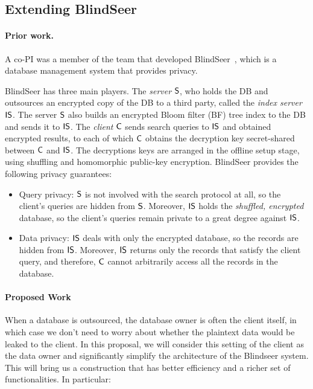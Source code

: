 
\subsection{Extending BlindSeer}
\label{sec:ext-blindseer}

\paragraph{Prior work.} A co-PI was a member of the team that developed
BlindSeer~\cite{SP:PKVKMC14,SP:FVKKKM15}, which is a database management system
that provides privacy.

BlindSeer has three main players. The {\em server} $\sf S$,
who holds the DB and outsources an encrypted copy of the DB to a third party,
called the {\em index server} $\sf IS$. The server $\sf S$  also builds an
encrypted Bloom filter (BF) tree index to the DB and sends it to $\sf IS$. The
{\em client} $\sf C$ sends search queries to $\sf IS$ and obtained encrypted
results, to each of which $\sf C$ obtains the decryption key secret-shared
between $\sf C$ and $\sf IS$. The decryptions keys are arranged in the offline
setup stage, using shuffling and homomorphic public-key
encryption.
%
BlindSeer provides the following privacy guarantees:
\begin{itemize}
\item Query privacy: $\sf S$ is not involved with the search protocol at
  all, so the client's queries are hidden from $\sf S$. Moreover, $\sf IS$ holds
    the {\em shuffled, encrypted} database, so the client's queries remain
    private to a great degree against $\sf IS$. 

\item Data privacy: $\sf IS$ deals with only the encrypted database, so the
records are hidden from $\sf IS$. Moreover, $\sf IS$ returns only the records
that satisfy the client query, and therefore, $\sf C$ cannot arbitrarily access
all the records in the database.  
\end{itemize}

\paragraph{Proposed Work}
When a database is outsourced, the database owner is often the client
itself, in which case we don't need to worry about whether the plaintext data
would be leaked to the client.  In this proposal, we will consider this setting
of the client as the data owner and significantly simplify the architecture of
the Blindseer system. This will bring us a construction that has better
efficiency and a richer set of functionalities. In particular:

